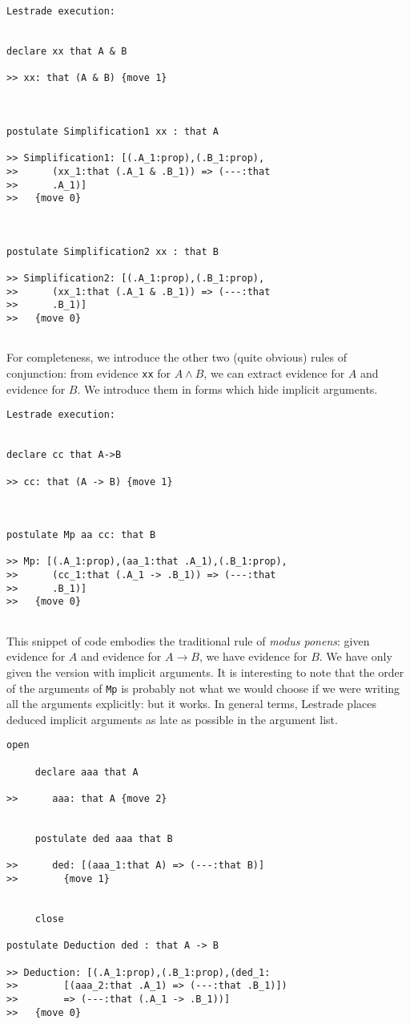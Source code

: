 \documentclass[12pt]{article}
\begin{document}
\begin{verbatim}Lestrade execution:


declare xx that A & B

>> xx: that (A & B) {move 1}



postulate Simplification1 xx : that A

>> Simplification1: [(.A_1:prop),(.B_1:prop),
>>      (xx_1:that (.A_1 & .B_1)) => (---:that
>>      .A_1)]
>>   {move 0}



postulate Simplification2 xx : that B

>> Simplification2: [(.A_1:prop),(.B_1:prop),
>>      (xx_1:that (.A_1 & .B_1)) => (---:that
>>      .B_1)]
>>   {move 0}


\end{verbatim}

For completeness, we introduce the other two (quite obvious) rules of conjunction:  from evidence {\tt xx} for $A \wedge B$, we can extract evidence for $A$ and evidence for $B$.  We introduce them in forms which hide implicit arguments.

\begin{verbatim}Lestrade execution:


declare cc that A->B

>> cc: that (A -> B) {move 1}



postulate Mp aa cc: that B

>> Mp: [(.A_1:prop),(aa_1:that .A_1),(.B_1:prop),
>>      (cc_1:that (.A_1 -> .B_1)) => (---:that
>>      .B_1)]
>>   {move 0}


\end{verbatim}

This snippet of code embodies the traditional rule of {\em modus ponens}:  given evidence for $A$ and evidence for $A \rightarrow B$, we have evidence for $B$.  We have only given the version with implicit arguments.  It is interesting to note that the order of the arguments of {\tt Mp} is probably not what we would choose if we were writing all the arguments explicitly:  but it works.  In general terms, Lestrade places deduced implicit arguments as late as possible in  the argument list.

    \begin{verbatim}
open

     declare aaa that A

>>      aaa: that A {move 2}


     postulate ded aaa that B

>>      ded: [(aaa_1:that A) => (---:that B)]
>>        {move 1}


     close

postulate Deduction ded : that A -> B

>> Deduction: [(.A_1:prop),(.B_1:prop),(ded_1:
>>        [(aaa_2:that .A_1) => (---:that .B_1)])
>>        => (---:that (.A_1 -> .B_1))]
>>   {move 0}


\end{verbatim}
\end{document}
